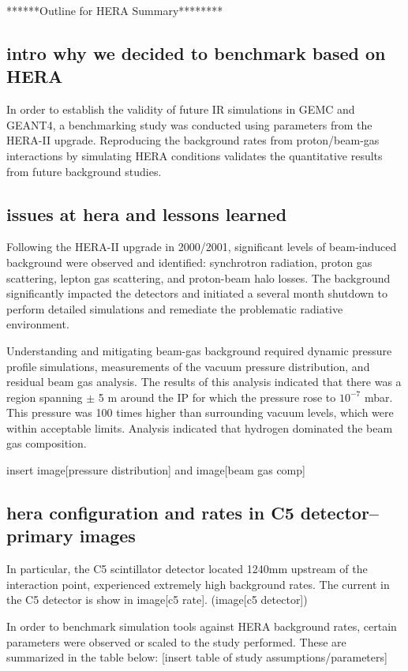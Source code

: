 ******Outline for HERA Summary********

\subsection{intro why we decided to benchmark based on HERA}

In order to establish the validity of future IR simulations in GEMC and GEANT4, a benchmarking study was conducted using parameters from the HERA-II upgrade.  Reproducing the background rates from proton/beam-gas interactions by simulating HERA conditions validates the quantitative results from future background studies.

\subsection{issues at hera and lessons learned}
Following the HERA-II upgrade in 2000/2001, significant levels of beam-induced background were observed and identified: synchrotron radiation, proton gas scattering, lepton gas scattering, and proton-beam halo losses.  The background significantly impacted the detectors and initiated a several month shutdown to perform detailed simulations and remediate the problematic radiative environment.

Understanding and mitigating beam-gas background required dynamic pressure profile simulations, measurements of the vacuum pressure distribution, and residual beam gas analysis.  The results of this analysis indicated that there was a region spanning $\pm$ 5 m around the IP for which the pressure rose to $10^{-7}$ mbar.  This pressure was 100 times higher than surrounding vacuum levels, which were within acceptable limits.  Analysis indicated that hydrogen dominated the beam gas composition. 

insert image[pressure distribution] and image[beam gas comp]

\subsection{hera configuration and rates in C5 detector-- primary images}
In particular, the C5 scintillator detector located 1240mm upstream of the interaction point, experienced extremely high background rates.  The current in the C5 detector is show in image[c5 rate]. (image[c5 detector])

In order to benchmark simulation tools against HERA background rates, certain parameters were observed or scaled to the study performed.  These are summarized in the table below:
[insert table of study assumptions/parameters]


